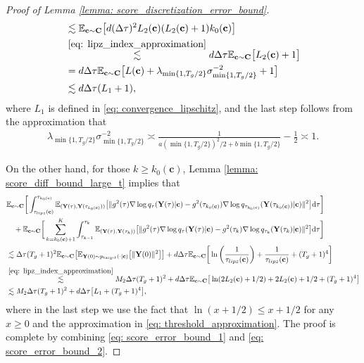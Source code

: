 \documentclass[11pt]{article}
\newcommand{\mE}{\mathbb{E}}
\newcommand{\bY}{\mathbf{Y}}
\newcommand{\bc}{\mathbf{c}}
\newcommand{\bC}{\mathbf{C}}
\newcommand{\tar}{{\text{target}}}
\newcommand{\intd}{\mathrm{d}}
\begin{document}
\begin{proof}[Proof of Lemma \ref{lemma: score_discretization_error_bound}]
\begin{align}
    &\lesssim \mE_{\bc\sim\bC}\big[d(\Delta\tau)^2L_2(\bc)(L_2(\bc) + 1)k_0(\bc)\big] \nonumber\\
    &\overset{\eqref{eq: lipz_index_approximation}}{\lesssim} d\Delta\tau\mE_{\bc\sim\bC}\big[L_2(\bc) + 1\big]\nonumber\\
    &=  d\Delta\tau\mE_{\bc\sim\bC}\big[L(\bc) + \lambda_{\min\{1, T_g/2\}}\sigma_{\min\{1, T_g/2\}}^{-2} + 1\big] \nonumber\\
    &\lesssim d\Delta\tau(L_1 + 1),\label{eq: score_error_bound_1}
\end{align}
where $L_1$ is defined in \eqref{eq: convergence_lipschitz}, and the last step follows from the approximation that
\begin{align}\label{eq: threshold_approximation}
    \lambda_{\min\{1, T_g/2\}}\sigma_{\min\{1, T_g/2\}}^{-2} \asymp  \frac{1}{a(\min\{1, T_g/2\})^2/2 + b\min\{1, T_g/2\}} - \frac{1}{2} \asymp 1.
\end{align}

On the other hand, for those $k \ge k_0(\bc)$, Lemma \ref{lemma: score_diff_bound_large_t} implies that
\begin{align}
    & \mE_{\bc\sim\bC}\bigg[\int_{\tau_{lipz}(\bc)}^{\tau_{k_0(\bc)}} \mE_{(\bY(\tau), \bY(\tau_{k_0(\bc)}))}\big[\|g^2(\tau)\nabla\log q_{\tau}(\bY(\tau) | \bc) - g^2(\tau_{k_0(\bc)})\nabla\log q_{\tau_{k_0(\bc)}}(\bY(\tau_{k_0(\bc)}) | \bc ) \|^2\big] \intd\tau\bigg]\nonumber\\
    & \quad + \mE_{\bc\sim\bC}\bigg[\sum_{k=k_0(\bc) + 1}^{K }\int_{\tau_{k - 1}}^{\tau_k}\mE_{(\bY(\tau), \bY(\tau_k))}\big[\|g^2(\tau)\nabla\log q_{\tau}(\bY(\tau) | \bc) - g^2(\tau_k)\nabla\log q_{\tau_k}(\bY(\tau_k) | \bc ) \|^2\big] \intd\tau\bigg]\nonumber\\
    &\lesssim \Delta\tau (T_g + 1)^2 \mE_{\bc\sim\bC} \big[\mE_{\bY(0)\sim p_\tar(\cdot | \bc)} \big[\|\bY(0)\|^2\big]\big] + d\Delta\tau\mE_{\bc\sim\bC}\bigg[\ln\bigg(\frac{1}{\tau_{lipz}(\bc)} \bigg) + \frac{1}{\tau_{lipz}(\bc)} + (T_g + 1)^4 \bigg] \nonumber\\
    &\overset{\eqref{eq: lipz_index_approximation}}{\lesssim} M_2\Delta\tau (T_g + 1)^2 + d\Delta\tau \mE_{\bc\sim\bC}\big[\ln(2L_2(\bc) + 1/2) + 2L_2(\bc) + 1/2 + (T_g + 1)^4 \big] \nonumber\\
    &\lesssim M_2\Delta\tau (T_g + 1)^2 + d\Delta\tau \big[L_1 + (T_g + 1)^4 \big],\label{eq: score_error_bound_2}
\end{align}
where in the last step we use the fact that $\ln(x + 1/2) \le x + 1/2$ for any $x\ge 0$ and the approximation in \eqref{eq: threshold_approximation}. The proof is complete by combining \eqref{eq: score_error_bound_1} and \eqref{eq: score_error_bound_2}.
\end{proof}
\end{document}
